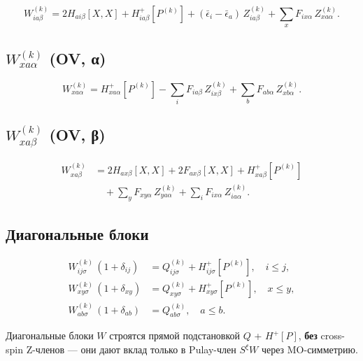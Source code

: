 \documentclass[11pt, a4paper]{article}
\theoremstyle{definition}
\newcommand{\Hp}{H^{+}}
\begin{document}
\begin{equation}
    \boxed{
        W^{(k)}_{ia\beta} = 2 H_{ai\beta}[X, X] + \Hp_{ia\beta}[P^{(k)}] + (\bar\epsilon_i - \bar\epsilon_a)\, Z^{(k)}_{ia\beta} + \sum_x F_{ix\alpha}\, Z^{(k)}_{xa\alpha}.
    }
\end{equation}

\subsection{$W^{(k)}_{xa\alpha}$ (OV, α)}

\begin{equation}
    \boxed{
        W^{(k)}_{xa\alpha} = \Hp_{xa\alpha}[P^{(k)}] - \sum_i F_{ia\beta}\, Z^{(k)}_{ix\beta} + \sum_b F_{ab\alpha}\, Z^{(k)}_{xb\alpha}.
    }
\end{equation}

\subsection{$W^{(k)}_{xa\beta}$ (OV, β)}

\begin{equation}
    \boxed{
    \begin{aligned}
        W^{(k)}_{xa\beta} &= 2 H_{ax\beta}[X, X] + 2 F_{ax\beta}[X, X] + \Hp_{xa\beta}[P^{(k)}] \\
        &\quad + \sum_y F_{xy\alpha}\, Z^{(k)}_{ya\alpha} + \sum_i F_{ix\alpha}\, Z^{(k)}_{ia\alpha}.
    \end{aligned}}
\end{equation}

\subsection{Диагональные блоки}

\begin{align}
    W^{(k)}_{ij\sigma}\, (1 + \delta_{ij}) &= Q^{(k)}_{ij\sigma} + \Hp_{ij\sigma}[P^{(k)}], \quad i \le j, \\
    W^{(k)}_{xy\sigma}\, (1 + \delta_{xy}) &= Q^{(k)}_{xy\sigma} + \Hp_{xy\sigma}[P^{(k)}], \quad x \le y, \\
    W^{(k)}_{ab\sigma}\, (1 + \delta_{ab}) &= Q^{(k)}_{ab\sigma}, \quad a \le b.
\end{align}

Диагональные блоки $W$ строятся прямой подстановкой $Q$ + $\Hp[P]$, \textbf{без} cross-spin Z-членов --- они дают вклад только в Pulay-член $S^\xi W$ через MO-симметрию.
\end{document}
